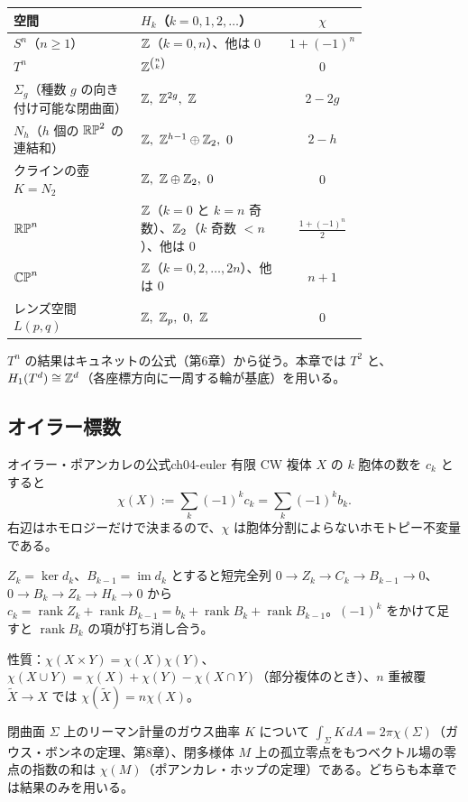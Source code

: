 \begin{center}
\small
\renewcommand{\arraystretch}{1.25}
\begin{tabular}{p{0.36\linewidth}|p{0.42\linewidth}|c}
空間 & $H_k$（$k=0,1,2,\dots$） & $\chi$\\ \hline
$S^n$（$n\ge1$） & $\mathbb{Z}$（$k=0,n$）、他は $0$ & $1+(-1)^n$\\
$T^n$ & $\mathbb{Z}^{\binom nk}$ & $0$\\
$\Sigma_g$（種数 $g$ の向き付け可能な閉曲面） & $\Z,\ \Z^{2g},\ \Z$ & $2-2g$\\
$N_h$（$h$ 個の $\mathbb{RP}^2$ の連結和） & $\Z,\ \Z^{h-1}\oplus\Z_2,\ 0$ & $2-h$\\
クラインの壺 $K=N_2$ & $\Z,\ \Z\oplus\Z_2,\ 0$ & $0$\\
$\mathbb{RP}^n$ & $\mathbb{Z}$（$k=0$ と $k=n$ 奇数）、$\mathbb{Z}_2$（$k$ 奇数 $<n$）、他は $0$ & $\frac{1+(-1)^n}{2}$\\
$\mathbb{CP}^n$ & $\mathbb{Z}$（$k=0,2,\dots,2n$）、他は $0$ & $n+1$\\
レンズ空間 $L(p,q)$ & $\Z,\ \Z_p,\ 0,\ \Z$ & $0$
\end{tabular}
\end{center}
$T^n$ の結果はキュネットの公式（第6章）から従う。本章では $T^2$ と、$H_1(T^d)\cong\mathbb{Z}^d$（各座標方向に一周する輪が基底）を用いる。

\subsection{オイラー標数}

\begin{mythm}{オイラー・ポアンカレの公式}{ch04-euler}
有限 CW 複体 $X$ の $k$ 胞体の数を $c_k$ とすると
\[
\chi(X):=\sum_k(-1)^kc_k=\sum_k(-1)^kb_k .
\]
右辺はホモロジーだけで決まるので、$\chi$ は胞体分割によらないホモトピー不変量である。
\end{mythm}
\begin{note}
$Z_k=\ker d_k$、$B_{k-1}=\operatorname{im}d_k$ とすると短完全列 $0\to Z_k\to C_k\to B_{k-1}\to0$、$0\to B_k\to Z_k\to H_k\to0$ から $c_k=\operatorname{rank}Z_k+\operatorname{rank}B_{k-1}=b_k+\operatorname{rank}B_k+\operatorname{rank}B_{k-1}$。$(-1)^k$ をかけて足すと $\operatorname{rank}B_k$ の項が打ち消し合う。
\end{note}
性質：$\chi(X\times Y)=\chi(X)\chi(Y)$、$\chi(X\cup Y)=\chi(X)+\chi(Y)-\chi(X\cap Y)$（部分複体のとき）、$n$ 重被覆 $\tilde X\to X$ では $\chi(\tilde X)=n\chi(X)$。

閉曲面 $\Sigma$ 上のリーマン計量のガウス曲率 $K$ について $\int_\Sigma K\,dA=2\pi\chi(\Sigma)$（ガウス・ボンネの定理、第8章）、閉多様体 $M$ 上の孤立零点をもつベクトル場の零点の指数の和は $\chi(M)$（ポアンカレ・ホップの定理）である。どちらも本章では結果のみを用いる。

